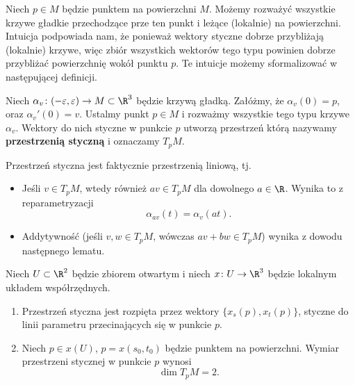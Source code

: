 Niech $p\in M$ będzie punktem na powierzchni $M$. Możemy rozważyć wszystkie krzywe gładkie przechodzące prze ten punkt i leżące (lokalnie) na powierzchni. Intuicja podpowiada nam, że ponieważ wektory styczne dobrze przybliżają (lokalnie) krzywe, więc zbiór wszystkich wektorów tego typu powinien dobrze przybliżać powierzchnię wokół punktu $p$. Te intuicje możemy sformalizować w następującej definicji.
\begin{frame}[<+->]

\begin{definicja}
Niech $\alpha_v\colon (-\varepsilon,\varepsilon)\to M\subset \R^3$ będzie krzywą gładką. Załóżmy, że $\alpha_v(0)=p$, oraz $\alpha_v'(0)=v$. Ustalmy punkt $p\in M$ i rozważmy wszystkie tego typu krzywe $\alpha_v$. Wektory do nich styczne w punkcie $p$ utworzą przestrzeń którą nazywamy \textbf{przestrzenią styczną} i oznaczamy $T_pM$.
\end{definicja}

\begin{uwaga}
Przestrzeń styczna jest faktycznie przestrzenią liniową, tj.
\begin{itemize}
\item Jeśli $v\in T_pM$, wtedy również $av\in T_pM$ dla dowolnego $a\in \R$. Wynika to z reparametryzacji
\[\alpha_{av}(t)=\alpha_v(at).\]
\item Addytywność (jeśli $v,w\in T_pM$, wówczas $av+bw\in T_pM$) wynika z dowodu następnego lematu.
\end{itemize}

\end{uwaga}


\end{frame}
\begin{frame}[<+->]




\end{frame}
\begin{frame}[<+->]

\begin{lemat}\label{lem:prop_tang_spce}
Niech $U\subset \R^2$ będzie zbiorem otwartym i niech $x\colon U\to \R^3$ będzie lokalnym układem współrzędnych.
\begin{enumerate}
\item Przestrzeń styczna jest rozpięta przez wektory $\{x_s(p),x_t(p)\}$, styczne do linii parametru przecinających się w punkcie $p$.
\item Niech $p\in x(U)$, $p=x(s_0,t_0)$ będzie punktem na powierzchni. Wymiar przestrzeni stycznej w punkcie $p$ wynosi\[\dim T_pM=2.\]
\end{enumerate}
\end{lemat}

\end{frame}
